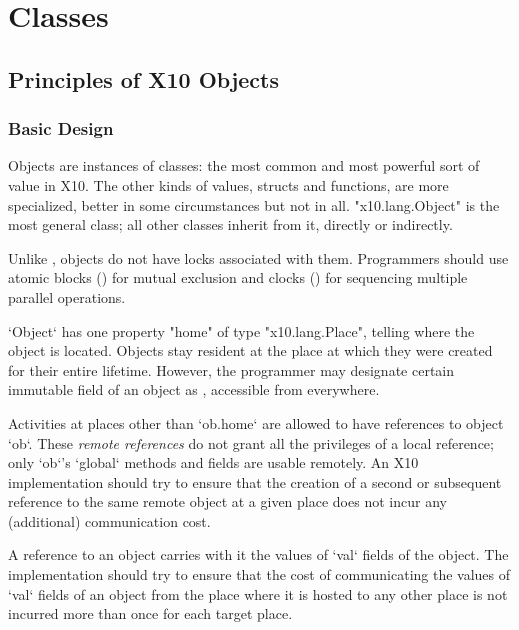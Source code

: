 \chapter{Classes}
\label{XtenClasses}

\section{Principles of X10 Objects}\label{XtenObjects}

\subsection{Basic Design}

Objects are instances of classes: the most common and most powerful sort of
value in X10.  The other kinds of values, structs and functions, are more
specialized, better in some circumstances but not in all.
\xcd"x10.lang.Object" is the most general class; all other classes inherit
from it, directly or indirectly. 


Unlike \java{}, {}\Xten{} objects do not have locks associated with them.
Programmers should use atomic blocks () for mutual
exclusion and clocks () for sequencing multiple parallel
operations.

\xcd`Object` has one property \xcd"home" of type
\xcd"x10.lang.Place", telling where the object is located.
Objects stay resident at the place at which they were created for their entire
lifetime. However, the programmer may designate certain immutable field of an
object as , accessible from everywhere.


Activities at places other than \xcd`ob.home` are allowed to have references
to object \xcd`ob`.   These {\em remote references} do not grant all the
privileges of a local reference; only \xcd`ob`'s \xcd`global` methods and
fields are usable remotely. An X10
implementation should try to ensure that the creation of a second or
subsequent reference to the same remote object at a given place does
not incur any (additional) communication cost.

A reference to an object carries with it the values of   \xcd`val`
fields 
of the object. The implementation should try to ensure that the cost
of communicating the values of \xcd`val` fields of an object from the
place where it is hosted to any other place is not incurred more than
once for each target place.

